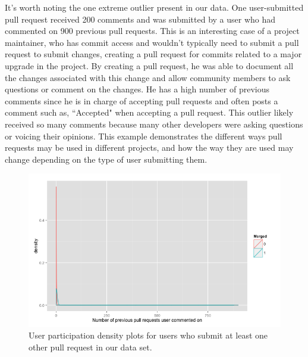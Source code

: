 \documentclass{sigchi}
\begin{document}
It's worth noting the one extreme outlier present in our data. One
user-submitted pull request received 200 comments and was submitted by a user
who had commented on 900 previous pull requests. This is an interesting case of
a project maintainer, who has commit access and wouldn't typically need to
submit a pull request to submit changes, creating a pull request for commits
related to a major upgrade in the project. By creating a pull request, he was
able to document all the changes associated with this change and allow community
members to ask questions or comment on the changes. He has a high number of
previous comments since he is in charge of accepting pull requests and often
posts a comment such as, ``Accepted" when accepting a pull request. This outlier
likely received so many comments because many other developers were asking
questions or voicing their opinions.  This example demonstrates the different
ways pull requests may be used in different projects, and how the way they are
used may change depending on the type of user submitting them.

\begin{figure}[p] \centering
\includegraphics[scale=0.6]{figures/number_comments_density_repeaters_ggplot.png}
\caption{User participation density plots for users who submit at least one
other pull request in our data set.} \label{fig:repeaters} \end{figure}
\end{document}
